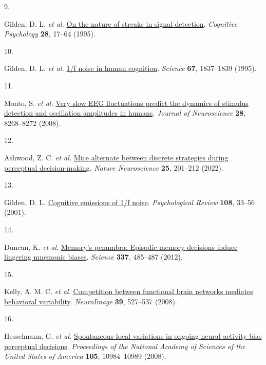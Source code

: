 \documentclass[
]{article}
\newlength{\cslhangindent}
\newlength{\csllabelwidth}
\newlength{\cslentryspacingunit} %
\newenvironment{CSLReferences}[2] %
 {%
  \setlength{\parindent}{0pt}
  \ifodd #1
  \let\oldpar\par
  \def\par{\hangindent=\cslhangindent\oldpar}
  \fi
  \setlength{\parskip}{#2\cslentryspacingunit}
 }%
 {}
\newcommand{\CSLLeftMargin}[1]{\parbox[t]{\csllabelwidth}{#1}}
\newcommand{\CSLRightInline}[1]{\parbox[t]{\linewidth - \csllabelwidth}{#1}\break}
\begin{document}
\begin{CSLReferences}{0}{0}
\leavevmode{}%
\CSLLeftMargin{9. }%
\CSLRightInline{Gilden, D. L. \emph{et al.}
\href{https://doi.org/10.1006/cogp.1995.1002}{On the nature of streaks
in signal detection}. \emph{Cognitive Psychology} \textbf{28}, 17--64
(1995).}

\leavevmode{}%
\CSLLeftMargin{10. }%
\CSLRightInline{Gilden, D. L. \emph{et al.}
\href{https://doi.org/10.1126/science.7892611}{1/f noise in human
cognition}. \emph{Science} \textbf{67}, 1837--1839 (1995).}

\leavevmode{}%
\CSLLeftMargin{11. }%
\CSLRightInline{Monto, S. \emph{et al.}
\href{https://doi.org/10.1523/JNEUROSCI.1910-08.2008}{Very slow EEG
fluctuations predict the dynamics of stimulus detection and oscillation
amplitudes in humans}. \emph{Journal of Neuroscience} \textbf{28},
8268--8272 (2008).}

\leavevmode{}%
\CSLLeftMargin{12. }%
\CSLRightInline{Ashwood, Z. C. \emph{et al.}
\href{https://doi.org/10.1038/s41593-021-01007-z}{Mice alternate between
discrete strategies during perceptual decision-making}. \emph{Nature
Neuroscience} \textbf{25}, 201--212 (2022).}

\leavevmode{}%
\CSLLeftMargin{13. }%
\CSLRightInline{Gilden, D. L.
\href{https://doi.org/10.1037/0033-295X.108.1.33}{Cognitive emissions of
1/f noise}. \emph{Psychological Review} \textbf{108}, 33--56 (2001).}

\leavevmode{}%
\CSLLeftMargin{14. }%
\CSLRightInline{Duncan, K. \emph{et al.}
\href{https://doi.org/10.1126/science.1221936}{Memory's penumbra:
Episodic memory decisions induce lingering mnemonic biases}.
\emph{Science} \textbf{337}, 485--487 (2012).}

\leavevmode{}%
\CSLLeftMargin{15. }%
\CSLRightInline{Kelly, A. M. C. \emph{et al.}
\href{https://doi.org/10.1016/j.neuroimage.2007.08.008}{Competition
between functional brain networks mediates behavioral variability}.
\emph{NeuroImage} \textbf{39}, 527--537 (2008).}

\leavevmode{}%
\CSLLeftMargin{16. }%
\CSLRightInline{Hesselmann, G. \emph{et al.}
\href{https://doi.org/10.1073/pnas.0712043105}{Spontaneous local
variations in ongoing neural activity bias perceptual decisions}.
\emph{Proceedings of the National Academy of Sciences of the United
States of America} \textbf{105}, 10984--10989 (2008).}


\end{CSLReferences}
\end{document}
